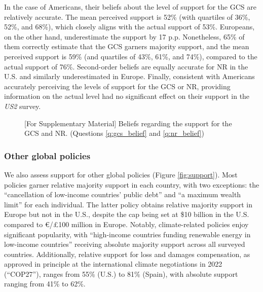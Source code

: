 In the case of Americans, 
their beliefs about the level of support for the GCS are relatively accurate. The mean perceived support is 52\% (with quartiles of 36\%, 52\%, and 68\%), which closely aligns with the actual support of 53\%. Europeans, on the other hand, underestimate the support by 17 p.p. Nonetheless, 65\% of them correctly estimate that the GCS garners majority support, and the mean perceived support is 59\% (and quartiles of 43\%, 61\%, and 74\%), compared to the actual support of 76\%. 
Second-order beliefs are equally accurate for NR in the U.S. and similarly underestimated in Europe. %
Finally, consistent with Americans accurately perceiving the levels of support for the GCS or NR, providing information on the actual level had no significant effect on their support in the \textit{US2} survey. %

\begin{figure}[h!]
    \caption[Beliefs about support for the GCS and NR]{[For Supplementary Material] Beliefs regarding the support for the GCS and NR. (Questions \ref{q:gcs_belief} and \ref{q:nr_belief})}\label{fig:belief}
\end{figure}

\subsubsection{Other global policies}\label{subsubsec:support_other_global_policies} %

We also assess support for other global policies (Figure \ref{fig:support}). 
Most policies garner relative majority support in each country, with two exceptions: 
the ``cancellation of low-income countries' public debt'' and ``a maximum wealth limit'' for each individual. 
The latter policy obtains relative majority support in Europe but not in the U.S., despite the cap being set at \$10 billion in the U.S. compared to \euro{}/£100 million in Europe. Notably, climate-related policies enjoy significant popularity, with ``high-income countries funding renewable energy in low-income countries'' receiving absolute majority support across all surveyed countries. Additionally, relative support for loss and damages compensation, as approved in principle at the international climate negotiations in 2022 (``COP27''), ranges from 55\% (U.S.) to 81\% (Spain), with absolute support ranging from 41\% to 62\%.

